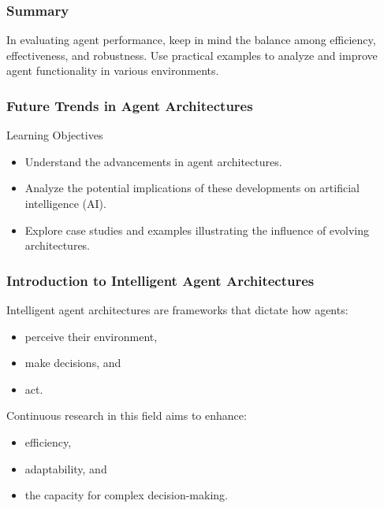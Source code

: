 \documentclass[aspectratio=169]{beamer}
\begin{document}
\begin{frame}[fragile]
    \frametitle{Summary}
    In evaluating agent performance, keep in mind the balance among efficiency, effectiveness, and robustness. Use practical examples to analyze and improve agent functionality in various environments.
\end{frame}

\begin{frame}[fragile]
    \frametitle{Future Trends in Agent Architectures}
    
    \begin{block}{Learning Objectives}
        \begin{itemize}
            \item Understand the advancements in agent architectures.
            \item Analyze the potential implications of these developments on artificial intelligence (AI).
            \item Explore case studies and examples illustrating the influence of evolving architectures.
        \end{itemize}
    \end{block}
    
\end{frame}

\begin{frame}[fragile]
    \frametitle{Introduction to Intelligent Agent Architectures}
    
    Intelligent agent architectures are frameworks that dictate how agents:
    \begin{itemize}
        \item perceive their environment,
        \item make decisions, and
        \item act.
    \end{itemize}
    
    Continuous research in this field aims to enhance:
    \begin{itemize}
        \item efficiency,
        \item adaptability, and
        \item the capacity for complex decision-making.
    \end{itemize}

\end{frame}
\end{document}
